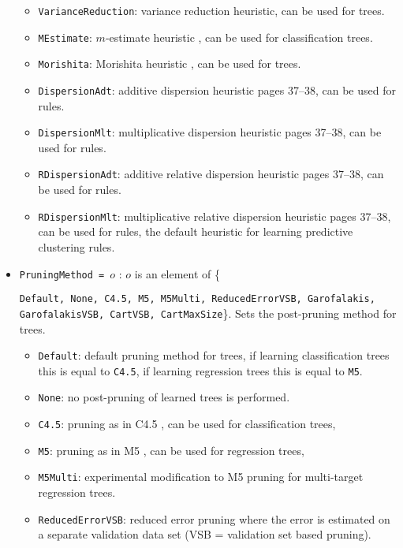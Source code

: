 \begin{itemize}
\begin{itemize}
		\item \texttt{VarianceReduction}: variance reduction heuristic, can be used for trees.
		\item \texttt{MEstimate}: $m$-estimate heuristic \cite{Cestnik1990}, can be used for classification trees.
		\item \texttt{Morishita}: Morishita heuristic \cite{Sese2004}, can be used for trees.%
		\item \texttt{DispersionAdt}: additive dispersion heuristic \cite{Zenko07} pages 37--38, can be used for rules.
		\item \texttt{DispersionMlt}: multiplicative dispersion heuristic \cite{Zenko07} pages 37--38, can be used for rules.
		\item \texttt{RDispersionAdt}: additive relative dispersion heuristic \cite{Zenko07} pages 37--38, can be used for rules.
		\item \texttt{RDispersionMlt}: multiplicative relative dispersion heuristic \cite{Zenko07} pages 37--38, can be used for rules, the default heuristic for learning predictive clustering rules.
	\end{itemize}
	\item \texttt{PruningMethod = $o$} : $o$ is an element of \{\raggedright\texttt{Default, None, C4.5, M5, M5Multi, ReducedErrorVSB, Garofalakis, GarofalakisVSB, CartVSB, CartMaxSize}\}. Sets the post-pruning method for trees.
	\begin{itemize}
		\item \texttt{Default}: default pruning method for trees, if learning classification trees this is equal to \texttt{C4.5}, if learning regression trees this is equal to \texttt{M5}. %
		\item \texttt{None}: no post-pruning of learned trees is performed.
		\item \texttt{C4.5}: pruning as in C4.5 \cite{Quinlan1993}, can be used for classification trees,
		\item \texttt{M5}: pruning as in M5 \cite{Quinlan1992},	can be used for regression trees,
		\item \texttt{M5Multi}: experimental modification to M5 \cite{Quinlan1992} pruning for multi-target regression trees.
		\item \texttt{ReducedErrorVSB}: reduced error pruning where the error is estimated on a separate validation data set (VSB = validation set based pruning).

\end{itemize}
\end{itemize}
